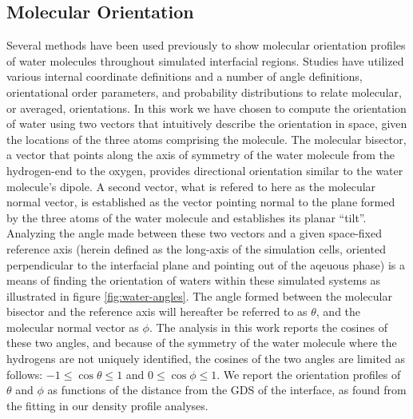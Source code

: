 \subsection{Molecular Orientation}
Several methods have been used previously to show molecular orientation profiles of water molecules throughout simulated interfacial regions.\cite{Wick2006c,Thomas2007,Wick2008a,Wick2007,Fan2009,Galamba2008,Ishiyama2007,Hore2007,Hore2008} Studies have utilized various internal coordinate definitions and a number of angle definitions, orientational order parameters, and probability distributions to relate molecular, or averaged, orientations. In this work we have chosen to compute the orientation of water using two vectors that intuitively describe the orientation in space, given the locations of the three atoms comprising the molecule. The molecular bisector, a vector that points along the axis of symmetry of the water molecule from the hydrogen-end to the oxygen, provides directional orientation similar to the water molecule's dipole. A second vector, what is refered to here as the molecular normal vector, is established as the vector pointing normal to the plane formed by the three atoms of the water molecule and establishes its planar ``tilt''. Analyzing the angle made between these two vectors and a given space-fixed reference axis (herein defined as the long-axis of the simulation cells, oriented perpendicular to the interfacial plane and pointing out of the aqeuous phase) is a means of finding the orientation of waters within these simulated systems as illustrated in figure \ref{fig:water-angles}. The angle formed between the molecular bisector and the reference axis will hereafter be referred to as $\theta$, and the molecular normal vector as $\phi$. The analysis in this work reports the cosines of these two angles, and because of the symmetry of the water molecule where the hydrogens are not uniquely identified, the cosines of the two angles are limited as follows: $-1\le\cos\theta\le1$ and $0\le\cos\phi\le1$. We report the orientation profiles of $\theta$ and $\phi$ as functions of the distance from the GDS of the interface, as found from the fitting in our density profile analyses.


